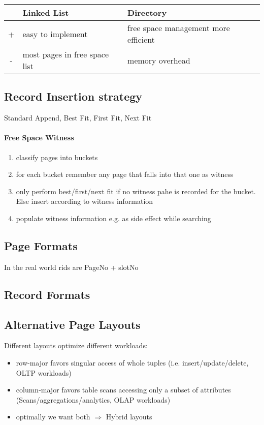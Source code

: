 

\begin{tabular}{c|p{4cm}|p{4cm}}
     & Linked List & Directory \\ \hline
 + & easy to implement & free space management more efficient \\ \hline
 - & most pages in free space list & memory overhead \\
\end{tabular}


    
\subsection{Record Insertion strategy}
Standard Append, Best Fit, First Fit, Next Fit \\
\paragraph{Free Space Witness}
\begin{enumerate}
    \item classify pages into buckets
    \item for each bucket remember any page that falls into that one as witness
    \item only perform best/first/next fit if no witness pahe is recorded for the bucket. Else insert according to witness information
    \item populate witness information e.g. as side effect while searching
\end{enumerate}

\subsection{Page Formats}
In the real world rids are PageNo + slotNo \\

\subsection{Record Formats}

\subsection{Alternative Page Layouts}
Different layouts optimize different workloads:
\begin{itemize}
    \item row-major favors singular access of whole tuples (i.e. insert/update/delete, OLTP workloads)
    \item column-major favors table scans accessing only a subset of attributes (Scans/aggregations/analytics, OLAP workloads)
    \item optimally we want both $\Rightarrow$ Hybrid layouts
\end{itemize}

